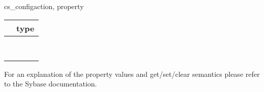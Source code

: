 \begin{methoddesc}[CS_CONTEXT]{cs_config}{action, property }
\begin{longtable}{l|l}
\var{property} & type \\
\hline
\code{CS_EXTERNAL_CONFIG} & \code{bool} \\
\code{CS_EXTRA_INF}       & \code{bool} \\
\code{CS_NOAPI_CHK}       & \code{bool} \\
\code{CS_VERSION}         & \code{int} \\
\code{CS_APPNAME}         & \code{string} \\
\code{CS_CONFIG_FILE}     & \code{string} \\
\code{CS_LOC_PROP}        & \code{locale} \\
\code{CS_MESSAGE_CB}      & \code{function} \\
\end{longtable}

For an explanation of the property values and get/set/clear semantics
please refer to the Sybase documentation.
\end{methoddesc}

